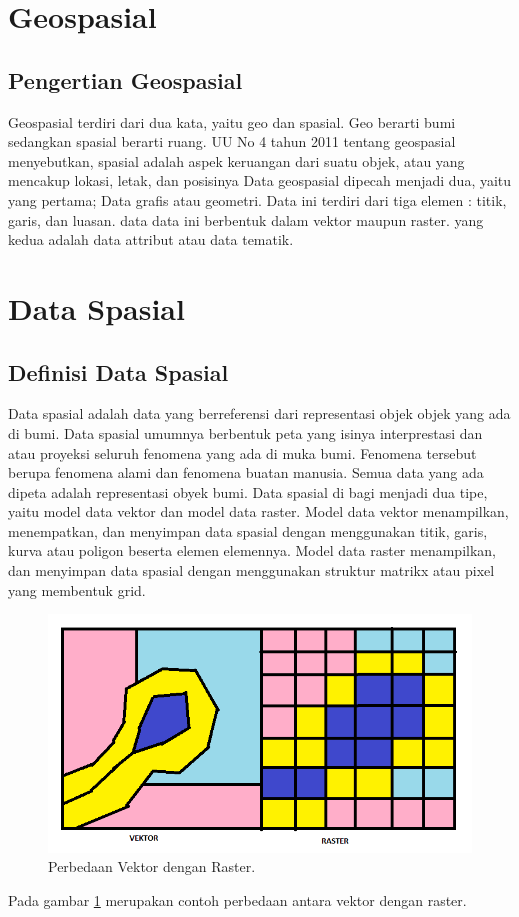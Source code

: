 \section{Geospasial}
\subsection{Pengertian Geospasial}
Geospasial terdiri dari dua kata, yaitu geo dan spasial. Geo berarti bumi sedangkan spasial berarti 
ruang. UU No 4 tahun 2011 tentang geospasial menyebutkan, spasial adalah aspek keruangan dari suatu objek, 
atau yang mencakup lokasi, letak, dan posisinya
Data geospasial dipecah menjadi dua, yaitu yang pertama; Data grafis atau geometri. Data ini terdiri dari
tiga elemen : titik, garis, dan luasan. data data ini berbentuk dalam vektor maupun raster. yang kedua
adalah data attribut atau data tematik.

\section{Data Spasial}
\subsection{Definisi Data Spasial}
Data spasial adalah data yang berreferensi dari representasi objek objek yang ada di bumi.
Data spasial umumnya berbentuk peta yang isinya interprestasi dan atau proyeksi seluruh 
fenomena yang ada di muka bumi. Fenomena tersebut berupa fenomena alami dan fenomena 
buatan manusia. Semua data yang ada dipeta adalah representasi obyek bumi.
Data spasial di bagi menjadi dua tipe, yaitu model data vektor dan model data raster. 
Model data vektor menampilkan, menempatkan, dan menyimpan data spasial dengan menggunakan 
titik, garis, kurva atau poligon beserta elemen elemennya. Model data raster menampilkan,
dan menyimpan data spasial dengan menggunakan struktur matrikx atau pixel yang membentuk grid.

\begin{figure}[ht]
	\centerline{\includegraphics[width=1\textwidth]{figures/vektorraster.PNG}}
	\caption{Perbedaan Vektor dengan Raster.}
	\label{vektoraster}
	\end{figure}
Pada gambar \ref{vektoraster} merupakan contoh perbedaan antara vektor dengan raster.

